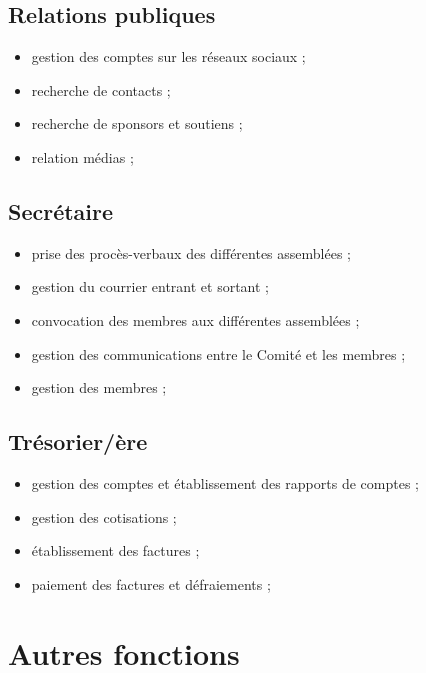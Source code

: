 \documentclass[12pt,twoside]{report}
\begin{document}
\subsection*{Relations publiques}
\begin{itemize}
\item gestion des comptes sur les réseaux sociaux ;
\item recherche de contacts ;
\item recherche de sponsors et soutiens ;
\item relation médias ;
\end{itemize}

\subsection*{Secrétaire}
\begin{itemize}
\item prise des procès-verbaux des différentes assemblées ;
\item gestion du courrier entrant et sortant ;
\item convocation des membres aux différentes assemblées ;
\item gestion des communications entre le Comité et les membres ;
\item gestion des membres ;
\end{itemize}

\subsection*{Trésorier/ère}
\begin{itemize}
\item gestion des comptes et établissement des rapports de comptes ;
\item gestion des cotisations ;
\item établissement des factures ;
\item paiement des factures et défraiements ;
\end{itemize}

\section*{Autres fonctions}
\end{document}
